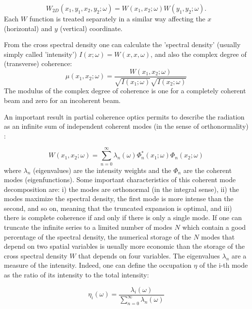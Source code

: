 \documentclass{iucr}              %
\begin{document}
\begin{equation}
W_{2D}(x_1,y_1,x_2,y_2;\omega) = W(x_1,x_2;\omega) W(y_1,y_2;\omega).
\label{eq:CSD_2D}
\end{equation}
Each $W$ function is treated separately in a similar way affecting the $x$ (horizontal) and $y$ (vertical) coordinate.

From the cross spectral density one can calculate the 'spectral density' (usually simply called 'intensity') $I(x;\omega)=W(x,x,\omega)$, and also the complex degree of (transverse) coherence: 
\begin{equation}
\mu(x_1,x_2;\omega) = \frac{W(x_1,x_2;\omega)}{\sqrt{I(x_1;\omega)}\sqrt{I(x_2;\omega)}}
\label{eq:DTC}
\end{equation}
The modulus of the complex degree of coherence is one for a completely coherent beam and zero for an incoherent beam. 

An important result in partial coherence optics permits to describe the radiation as an infinite sum of independent coherent modes (in the sense of orthonormality) :

\begin{equation}
W(x_1,x_2;\omega) = \sum_{n=0}^{\infty} \lambda_n(\omega) \Phi_n^*(x_1;\omega) \Phi_n(x_2;\omega) 
\label{eq:CMD}
\end{equation}
where $\lambda_n$ (eigenvalues) are the intensity weights and the $\Phi_n$ are the coherent modes (eigenfunctions). 
Some important characteristics of this coherent mode decomposition are: i) the modes are orthonormal (in the integral sense), ii) the modes maximize the spectral density, the first mode is more intense than the second, and so on, meaning that the truncated expansion is optimal, and iii) there is complete coherence if and only if there is only a single mode. If one can truncate the infinite series to a limited number of modes $N$ which contain a good percentage of the spectral density, the numerical storage of the $N$ modes that depend on two spatial variables is usually more economic than the storage of the cross spectral density $W$ that depends on four variables. 
The eigenvalues $\lambda_n$ are a measure of the intensity. Indeed, one can define the occupation $\eta$ of the i-th mode as the ratio of its intensity to the total intensity: 

\begin{equation}
\eta_i(\omega) = \frac{\lambda_i(\omega)}{\sum_{n=0}^{\infty} \lambda_n(\omega)}
\end{equation}
\end{document}
